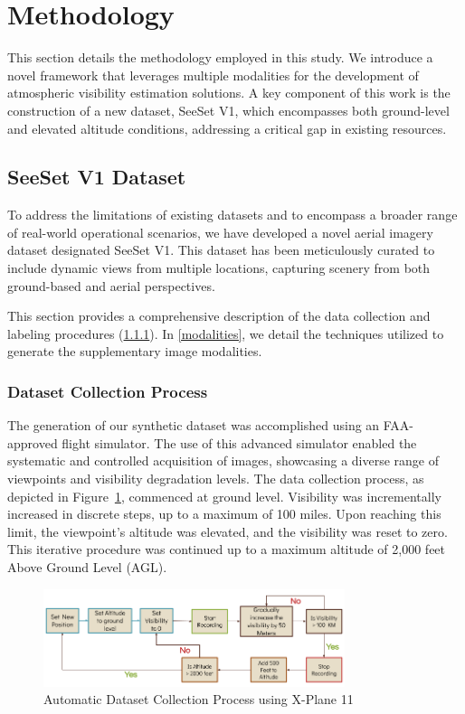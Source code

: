 \section{Methodology}
\label{sec:methodology}

This section details the methodology employed in this study. We introduce a novel framework that leverages multiple modalities for the development of atmospheric visibility estimation solutions. A key component of this work is the construction of a new dataset, SeeSet V1, which encompasses both ground-level and elevated altitude conditions, addressing a critical gap in existing resources.

\subsection{SeeSet V1 Dataset}
\label{sec:seeset}

To address the limitations of existing datasets and to encompass a broader range of real-world operational scenarios, we have developed a novel aerial imagery dataset designated SeeSet V1. This dataset has been meticulously curated to include dynamic views from multiple locations, capturing scenery from both ground-based and aerial perspectives.

This section provides a comprehensive description of the data collection and labeling procedures (\cref{data_collection}). In \cref{modalities}, we detail the techniques utilized to generate the supplementary image modalities.

\subsubsection{Dataset Collection Process}
\label{data_collection}

The generation of our synthetic dataset was accomplished using an FAA-approved flight simulator. The use of this advanced simulator enabled the systematic and controlled acquisition of images, showcasing a diverse range of viewpoints and visibility degradation levels. The data collection process, as depicted in Figure~\ref{fig:data_collection_process}, commenced at ground level. Visibility was incrementally increased in discrete steps, up to a maximum of 100 miles. Upon reaching this limit, the viewpoint's altitude was elevated, and the visibility was reset to zero. This iterative procedure was continued up to a maximum altitude of 2,000 feet Above Ground Level (AGL).


\begin{figure}[htbp]
\centerline{\includegraphics[width=250pt]{imgs/data_collection_pipeline.png}}
\caption{Automatic Dataset Collection Process using X-Plane 11}
\label{fig:data_collection_process}
\end{figure}
 

